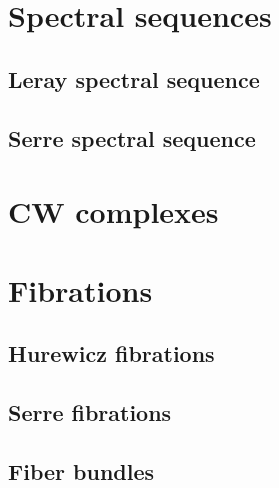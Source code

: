 \section{Spectral sequences}

\subsection{Leray spectral sequence}



\subsection{Serre spectral sequence}



\section{CW complexes}



\section{Fibrations}

\subsection{Hurewicz fibrations}




\subsection{Serre fibrations}




\subsection{Fiber bundles}



